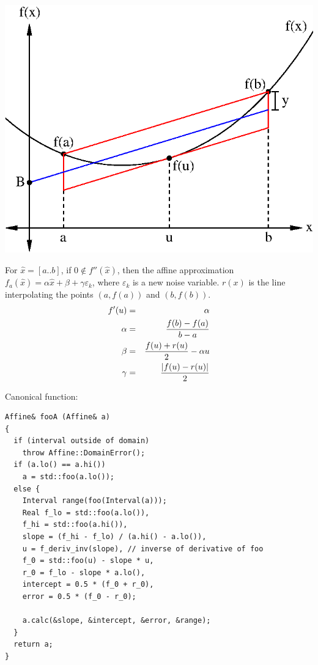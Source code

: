\documentclass[12pt]{article}
\begin{document}
\raggedright
{}
\includegraphics{diagram.eps}

For $\hat{x} = [a..b]$, if $0 \notin f''(\hat{x})$, then the affine approximation $f_a(\hat{x}) = \alpha \hat{x} + \beta + \gamma \varepsilon_k$, where
$\varepsilon_k$ is a new noise variable. $r(x)$ is the line interpolating the
points $(a, f(a))$ and $(b, f(b))$.
\begin{eqnarray*}
f'(u) & = & \alpha \\
\alpha & = & {{f(b) - f(a)} \over {b - a}} \\
\beta & = & {{f(u) + r(u)} \over 2} - \alpha u \\
\gamma & = & {{|f(u) - r(u)|} \over 2} \\
\end{eqnarray*}

\newpage
Canonical function:
\begin{verbatim}
Affine& fooA (Affine& a)
{
  if (interval outside of domain)
    throw Affine::DomainError();
  if (a.lo() == a.hi())
    a = std::foo(a.lo());
  else {
    Interval range(foo(Interval(a)));
    Real f_lo = std::foo(a.lo()),
    f_hi = std::foo(a.hi()),
    slope = (f_hi - f_lo) / (a.hi() - a.lo()),
    u = f_deriv_inv(slope), // inverse of derivative of foo
    f_0 = std::foo(u) - slope * u,
    r_0 = f_lo - slope * a.lo(),
    intercept = 0.5 * (f_0 + r_0),
    error = 0.5 * (f_0 - r_0);

    a.calc(&slope, &intercept, &error, &range);
  }
  return a;
}
\end{verbatim}
\end{document}
